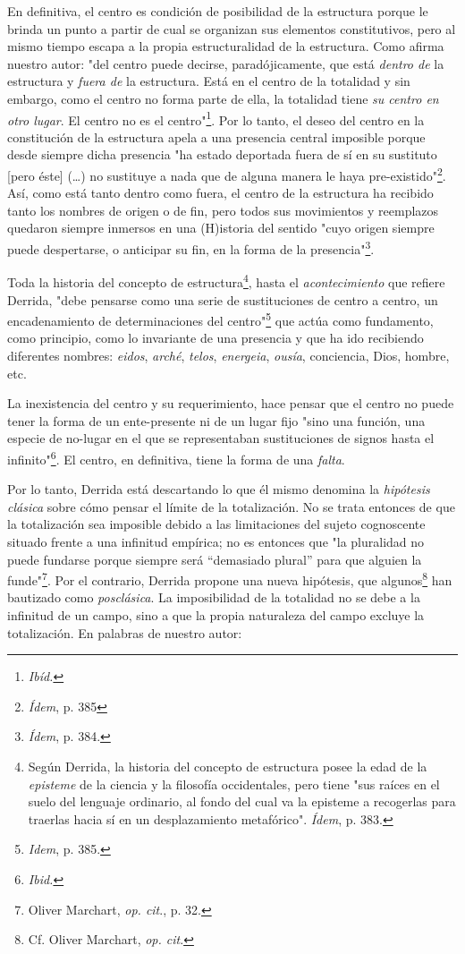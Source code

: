 \documentclass{book}
\begin{document}
En definitiva, el centro es condición de posibilidad de la estructura
porque le brinda un punto a partir de cual se organizan sus elementos
constitutivos, pero al mismo tiempo escapa a la propia estructuralidad
de la estructura. Como afirma nuestro autor: "del centro puede decirse,
paradójicamente, que está \emph{dentro de} la estructura y \emph{fuera
de} la estructura. Está en el centro de la totalidad y sin embargo, como
el centro no forma parte de ella, la totalidad tiene \emph{su centro en
otro lugar}. El centro no es el centro"\footnote{\emph{Ibíd.}}. Por lo
tanto, el deseo del centro en la constitución de la estructura apela a
una presencia central imposible porque desde siempre dicha presencia "ha
estado deportada fuera de sí en su sustituto {[}pero éste{]}
(\dots) no sustituye a nada que de alguna manera le haya
pre-existido"\footnote{\emph{Ídem}, p. 385}. Así, como está tanto dentro
como fuera, el centro de la estructura ha recibido tanto los nombres de
origen o de fin, pero todos sus movimientos y reemplazos quedaron
siempre inmersos en una (H)istoria del sentido "cuyo origen siempre
puede despertarse, o anticipar su fin, en la forma de la
presencia"\footnote{\emph{Ídem}, p. 384.}.

Toda la historia del concepto de estructura\footnote{Según Derrida, la
  historia del concepto de estructura posee la edad de la
  \emph{episteme} de la ciencia y la filosofía occidentales, pero tiene
  "sus raíces en el suelo del lenguaje ordinario, al fondo del cual va
  la episteme a recogerlas para traerlas hacia sí en un desplazamiento
  metafórico". \emph{Ídem}, p. 383.}, hasta el \emph{acontecimiento} que
refiere Derrida, "debe pensarse como una serie de sustituciones de
centro a centro, un encadenamiento de determinaciones del
centro"\footnote{\emph{Idem}, p. 385.} que actúa como fundamento, como
principio, como lo invariante de una presencia y que ha ido recibiendo
diferentes nombres: \emph{eidos}, \emph{arché}, \emph{telos},
\emph{energeia}, \emph{ousía}, conciencia, Dios, hombre, etc.

La inexistencia del centro y su requerimiento, hace pensar que el centro
no puede tener la forma de un ente-presente ni de un lugar fijo "sino
una función, una especie de no-lugar en el que se representaban
sustituciones de signos hasta el infinito"\footnote{\emph{Ibid.}}. El
centro, en definitiva, tiene la forma de una \emph{falta}.

Por lo tanto, Derrida está descartando lo que él mismo denomina la
\emph{hipótesis clásica} sobre cómo pensar el límite de la totalización.
No se trata entonces de que la totalización sea imposible debido a las
limitaciones del sujeto cognoscente situado frente a una infinitud
empírica; no es entonces que "la pluralidad no puede fundarse porque
siempre será ``demasiado plural'' para que alguien la funde"\footnote{Oliver
  Marchart, \emph{op. cit}., p. 32.}. Por el contrario, Derrida propone
una nueva hipótesis, que algunos\footnote{Cf. Oliver Marchart, \emph{op.
  cit}.} han bautizado como \emph{posclásica}. La imposibilidad de la
totalidad no se debe a la infinitud de un campo, sino a que la propia
naturaleza del campo excluye la totalización. En palabras de nuestro
autor:
\end{document}
